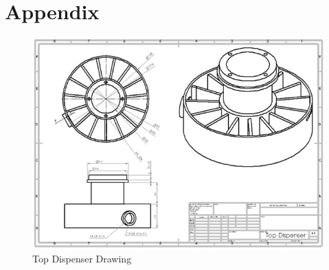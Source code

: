 \documentclass[12pt]{article}
\begin{document}
\section{Appendix}
\begin{figure}[H]
	\centering
	\includegraphics[width=1\linewidth]{A1.png}
	\caption{Top Dispenser Drawing}
\end{figure}
\newpage
\end{document}
